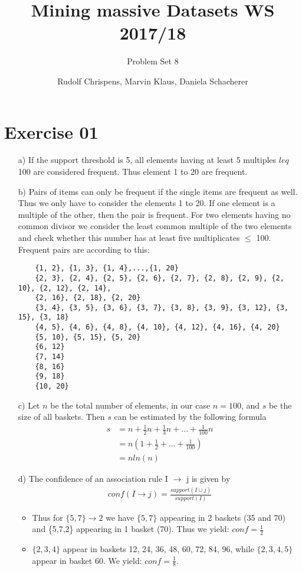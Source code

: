 \documentclass[11pt,a4paper]{scrartcl}
\title{Mining massive Datasets WS 2017/18}
\subtitle{Problem Set 8}
\author{Rudolf Chrispens, Marvin Klaus, Daniela Schacherer}
\begin{document}
\maketitle

\section*{Exercise 01}
\begin{itemize}
	\item[a)] If the support threshold is 5, all elements having at least 5 multiples $leq$ 100 are considered frequent. Thus element 1 to 20 are frequent. 
	\item[b)] Pairs of items can only be frequent if the single items are frequent as well. Thus we only have to consider the elements 1 to 20. If one element is a multiple of the other, then the pair is frequent. For two elements having no common divisor we consider the least common multiple of the two elements and check whether this number has at least five multiplicates $\leq$ 100. Frequent pairs are according to this:
	\begin{verbatim}
	{1, 2}, {1, 3}, {1, 4},...,{1, 20}
	{2, 3}, {2, 4}, {2, 5}, {2, 6}, {2, 7}, {2, 8}, {2, 9}, {2, 10}, {2, 12}, {2, 14}, 
	{2, 16}, {2, 18}, {2, 20}
	{3, 4}, {3, 5}, {3, 6}, {3, 7}, {3, 8}, {3, 9}, {3, 12}, {3, 15}, {3, 18} 
	{4, 5}, {4, 6}, {4, 8}, {4, 10}, {4, 12}, {4, 16}, {4, 20}
	{5, 10}, {5, 15}, {5, 20}
	{6, 12}
	{7, 14}
	{8, 16}
	{9, 18}
	{10, 20} 
	\end{verbatim}
	
	\item[c)] Let $n$ be the total number of elements, in our case $n = 100$, and $s$ be the size of all baskets. Then $s$ can be estimated by the following formula 
	\begin{align*}
		s &= n + \frac{1}{2}n + \frac{1}{3}n + ... + \frac{1}{100}n \\
		&= n (1 + \frac{1}{2}+...+ \frac{1}{100}) \\
		&= n ln(n)
	\end{align*}
	
	\item[d)] The confidence of an association rule I $\rightarrow$ j is given by 
	\begin{align*}
		conf(I \rightarrow j) = \frac{support(I \cup j)}{support(I)}
	\end{align*}
	\begin{itemize}
		\item Thus for $\{5, 7\} \rightarrow 2$ we have $\{5, 7\}$ appearing in 2 baskets (35 and 70) and \{5,7,2\} appearing in 1 basket (70). Thus we yield: $conf = \frac{1}{2}$
		\item $\{2,3,4\}$ appear in baskets 12, 24, 36, 48, 60, 72, 84, 96, while $\{2,3,4,5\}$ appear in basket 60. We yield: $conf = \frac{1}{8}$.
	\end{itemize}
	
\end{itemize}
\end{document}
